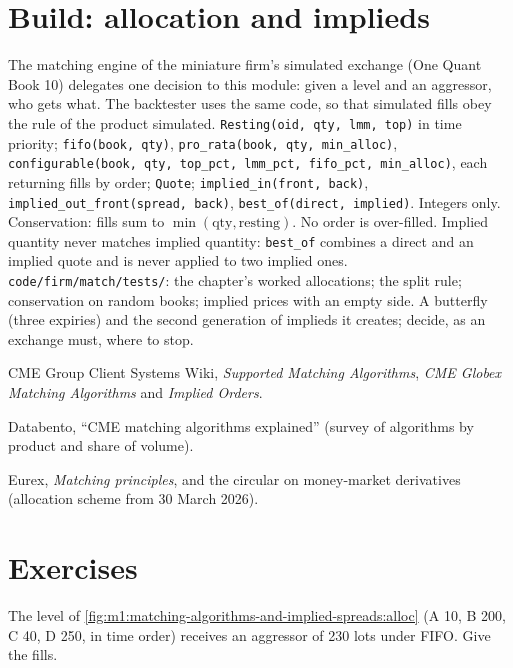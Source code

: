 \section{Build: allocation and implieds}\label{bld:m1:matching-algorithms-and-implied-spreads:match}

\begin{build}
 The matching engine of the miniature firm's simulated
exchange (One Quant Book 10) delegates one decision to this module: given a
level and an aggressor, who gets what. The backtester uses the same code, so
that simulated fills obey the rule of the product simulated.
 \texttt{Resting(oid, qty, lmm, top)} in time priority;
\texttt{fifo(book, qty)}, \texttt{pro\_rata(book, qty, min\_alloc)},
\texttt{configurable(book, qty, top\_pct, lmm\_pct, fifo\_pct, min\_alloc)},
each returning fills by order; \texttt{Quote}; \texttt{implied\_in(front,
back)}, \texttt{implied\_out\_front(spread, back)}, \texttt{best\_of(direct,
implied)}.
 Integers only. Conservation: fills sum to $\min(\text{qty},
\text{resting})$. No order is over-filled. Implied quantity never matches
implied quantity: \texttt{best\_of} combines a direct and an implied quote
and is never applied to two implied ones.
 \texttt{code/firm/match/tests/}: the chapter's
worked allocations; the split rule; conservation on random books; implied
prices with an empty side.
 A butterfly (three expiries) and the second generation of
implieds it creates; decide, as an exchange must, where to stop.
\end{build}

\begin{omsources}
\item CME Group Client Systems Wiki, \emph{Supported Matching Algorithms},
\emph{CME Globex Matching Algorithms} and \emph{Implied Orders}.
\item Databento, ``CME matching algorithms explained'' (survey of
algorithms by product and share of volume).
\item Eurex, \emph{Matching principles}, and the circular on money-market
derivatives (allocation scheme from 30 March 2026).
\end{omsources}

\section{Exercises}

\begin{exercise}[$\star$]\label{exo:m1:matching-algorithms-and-implied-spreads:1}
The level of \cref{fig:m1:matching-algorithms-and-implied-spreads:alloc} (A 10,
B 200, C 40, D 250, in time order) receives an aggressor of 230 lots under
FIFO. Give the fills.
\end{exercise}

